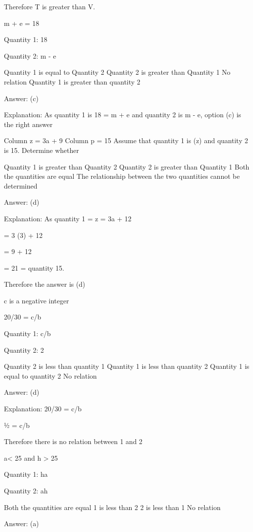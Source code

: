     Therefore T is greater than V. 




    m + e = 18

    Quantity 1: 18

    Quantity 2: m - e

        Quantity 1 is equal to Quantity 2
        Quantity 2 is greater than Quantity 1
        No relation
        Quantity 1 is greater than quantity 2

    Answer: (c)

    Explanation: As quantity 1 is 18 = m + e and quantity 2 is m - e, option (c) is the right answer

    Column z = 3a + 9
    Column p = 15
    Assume that quantity 1 is (z) and quantity 2 is 15. Determine whether

        Quantity 1 is greater than Quantity 2
        Quantity 2 is greater than Quantity 1
        Both the quantities are equal
        The relationship between the two quantities cannot be determined

    Answer: (d)

    Explanation:  As quantity 1 = z = 3a + 12

    = 3 (3) + 12

    = 9 + 12

    = 21 = quantity 15.

    Therefore the answer is (d)

    c is a negative integer

    20/30 = c/b

    Quantity 1: c/b

    Quantity 2: 2

        Quantity 2 is less than quantity 1
        Quantity 1 is less than quantity 2
        Quantity 1 is equal to quantity 2
        No relation

    Answer: (d)

    Explanation: 20/30 = c/b

    ½ = c/b

    Therefore there is no relation between 1 and 2

    a< 25 and h > 25

    Quantity 1: ha

    Quantity 2: ah

        Both the quantities are equal
        1 is less than 2
        2 is less than 1
        No relation

    Answer: (a)

